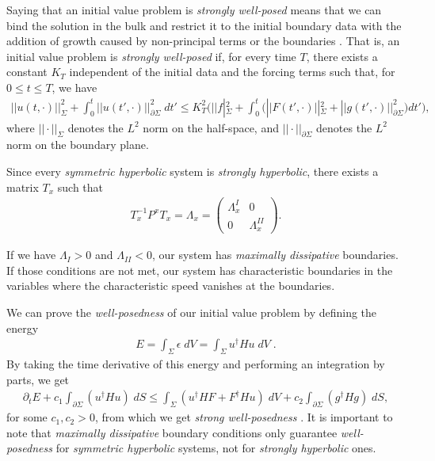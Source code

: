 Saying that an initial value problem is \textit{strongly well-posed} means that we can bind the solution in the bulk and restrict it to the initial boundary data with the addition of growth caused by non-principal terms or the boundaries \cite{AN_INTRODUCTION_TO_WELLPOSEDNESS_AND_FREEEVOLUTION}. That is, an initial value problem is \textit{strongly well-posed} if, for every time $T$, there exists a constant $K_T$ independent of the initial data and the forcing terms such that, for $0 \leq t \leq T$, we have
%
\begin{align}
 ||u(t,\cdot)||^{2}_\Sigma + \int_{0}^{t} ||u(t',\cdot)||^{2}_{\partial \Sigma} \; dt' 
     \leq K_{T}^{2} \Bigg( ||f|^{2}_\Sigma + \int_{0}^{t} \Big(||F(t',\cdot)||^{2}_\Sigma + ||g(t',\cdot)||^{2}_{\partial \Sigma} \Big) dt' \Bigg),
\end{align}
%
where $||\cdot||_\Sigma$ denotes the $L^2$ norm on the half-space, and $||\cdot||_{\partial \Sigma}$ denotes the $L^2$ norm on the boundary plane.

Since every \textit{symmetric hyperbolic} system is \textit{strongly hyperbolic}, there exists a matrix $T_x$ such that
%
\begin{align}
 T_x^{-1}P^x T_x = \Lambda_x = 
    \begin{pmatrix} 
        \Lambda_x^I & 0 \\
        0 & \Lambda_x^{II} 
    \end{pmatrix}.
\end{align}

If we have $\Lambda_I > 0$ and $\Lambda_{II} < 0$, our system has \textit{maximally dissipative} boundaries. If those conditions are not met, our system has characteristic boundaries in the variables where the characteristic speed vanishes at the boundaries.

We can prove the \textit{well-posedness} of our initial value problem by defining the energy
%
\begin{align}
 E = \int_\Sigma \epsilon \; dV = \int_\Sigma u^\dagger H u \; dV \; .
\end{align}
%
By taking the time derivative of this energy and performing an integration by parts, we get
%
\begin{align}
  \partial_t E + c_1 \int_{\partial\Sigma} \left( u^\dagger H u \right) \; dS 
    \leq \int_\Sigma \left( u^\dagger H F + F^\dagger H u \right) \; dV + c_2 \int_{\partial \Sigma} \left( g^\dagger H g\right) \; dS ,
\end{align}
%
for some $c_1, c_2 > 0$, from which we get \textit{strong well-posedness} \cite{AN_INTRODUCTION_TO_WELLPOSEDNESS_AND_FREEEVOLUTION}. It is important to note that \textit{maximally dissipative} boundary conditions only guarantee \textit{well-posedness} for \textit{symmetric hyperbolic} systems, not for \textit{strongly hyperbolic} ones.

